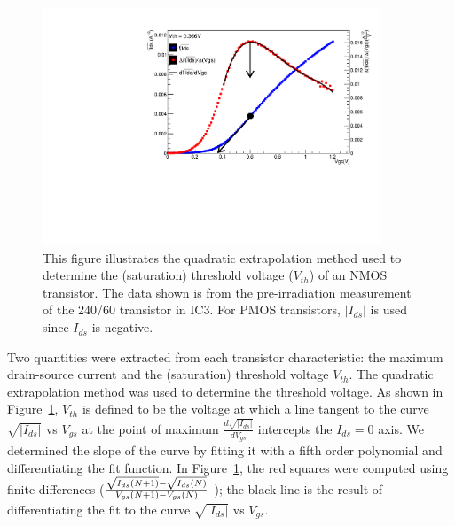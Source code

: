 \begin{figure}
\begin{center}
\includegraphics[height=7.12cm]{Quadratic_Method.pdf}
\caption{This figure illustrates the quadratic extrapolation method used to determine the (saturation) threshold voltage ($V_{th}$) of an NMOS transistor.  The data shown is from the pre-irradiation measurement of the 240/60 transistor in IC3.
For PMOS transistors, $|I_{ds}|$ is used since $I_{ds}$ is negative.}
\label{fig:QuadMethod}
\end{center}
\end{figure}

Two quantities were extracted from each transistor characteristic: the maximum drain-source current and the (saturation) threshold voltage $V_{th}$.  The quadratic extrapolation method was used to determine the threshold voltage\cite{Schroder}.  As shown in Figure~\ref{fig:QuadMethod}, $V_{th}$ is defined to be the voltage at which a line tangent to the curve $\sqrt{|I_{ds}|}$ vs $ V_{gs}$ at the point of maximum $\frac{d\sqrt{|I_{ds}|}}{dV_{gs}}$ intercepts the $I_{ds}=0$ axis.  We determined the slope of the curve by fitting it with a fifth order polynomial and differentiating the fit function.  In Figure~\ref{fig:QuadMethod}, the red squares were computed using finite differences
\Big({${\sqrt{I_{ds}(N+1)}-\sqrt{I_{ds}(N)}\over{V_{gs}(N+1)-V_{gs}(N)}}$} \Big); the black line is the result of differentiating the fit to the curve $\sqrt{|I_{ds}|}$ vs $ V_{gs}$.

